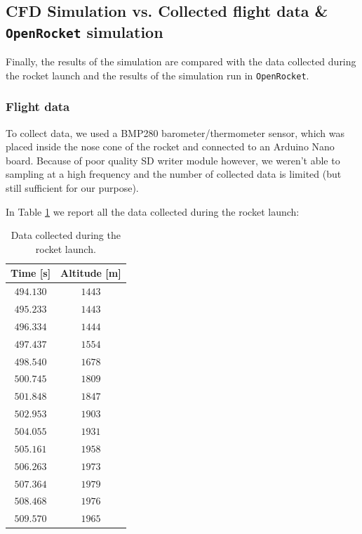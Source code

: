 \subsection{CFD Simulation vs. Collected flight data \& \texttt{OpenRocket} simulation}
\label{subsec:cfd_vs_flight_data}

Finally, the results of the simulation are compared with the data collected during the rocket launch and the results of the simulation run in \texttt{OpenRocket}.

\subsubsection{Flight data}
\label{subsubsec:flight_data}

To collect data, we used a BMP280 barometer/thermometer sensor, which was placed inside the nose cone of the rocket and connected to an Arduino Nano board.
Because of poor quality SD writer module however, we weren't able to sampling at a high frequency and the number of collected data is limited (but still sufficient for our purpose).

In Table \ref{tab:flight_data} we report all the data collected during the rocket launch:

\begin{table}[H]
    \centering
    \begin{tabular}{|c|c|}
        \hline
        \textbf{Time [s]} & \textbf{Altitude [m]} \\
        \hline
        $494.130$         & $1443$                \\
        $495.233$         & $1443$                \\
        $496.334$         & $1444$                \\
        $497.437$         & $1554$                \\
        $498.540$         & $1678$                \\
        $500.745$         & $1809$                \\
        $501.848$         & $1847$                \\
        $502.953$         & $1903$                \\
        $504.055$         & $1931$                \\
        $505.161$         & $1958$                \\
        $506.263$         & $1973$                \\
        $507.364$         & $1979$                \\
        $508.468$         & $1976$                \\
        $509.570$         & $1965$                \\
        \hline
    \end{tabular}
    \caption{Data collected during the rocket launch.}
    \label{tab:flight_data}
\end{table}

